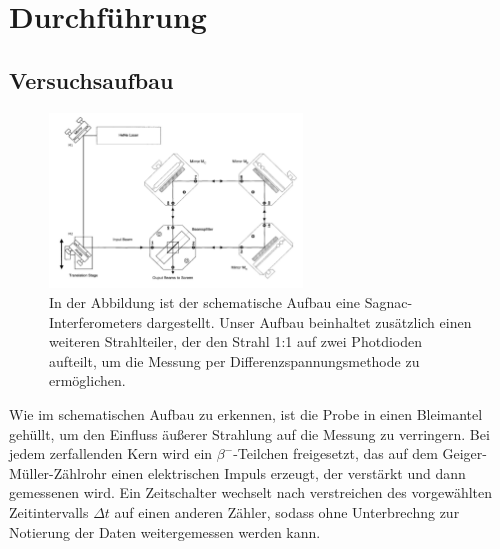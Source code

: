 \newpage
\section{Durchführung}
    \subsection{Versuchsaufbau}

        \FloatBarrier

        \begin{figure}[h]
          \centering
          \includegraphics[width = 0.6\textwidth]{pictures/Sagnac.png}
          \caption{In der Abbildung ist der schematische Aufbau eine Sagnac-Interferometers dargestellt. Unser Aufbau beinhaltet zusätzlich einen weiteren Strahlteiler, der den Strahl 1:1 auf zwei Photdioden aufteilt, um die Messung per Differenzspannungsmethode zu ermöglichen.}
          \label{fig:Aufbau}
        \end{figure}

        \FloatBarrier

        \noindent
        Wie im schematischen Aufbau zu erkennen, ist die Probe in einen Bleimantel gehüllt, um den Einfluss äußerer Strahlung auf die Messung zu verringern. Bei jedem zerfallenden Kern wird ein
        $\beta^-$-Teilchen freigesetzt, das auf dem Geiger-Müller-Zählrohr einen elektrischen Impuls erzeugt, der verstärkt und dann gemessenen wird. Ein Zeitschalter wechselt nach verstreichen
        des vorgewählten Zeitintervalls $\Delta t$ auf einen anderen Zähler, sodass ohne Unterbrechng zur Notierung der Daten weitergemessen werden kann.

